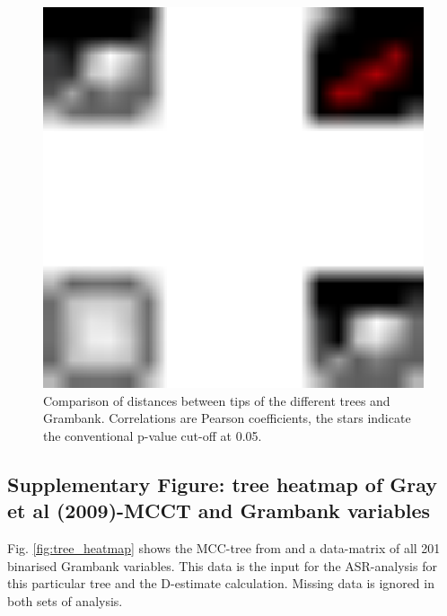 \documentclass[12pt,letterpaper]{article}
\begin{document}
\begin{figure}[!ht]
\centering
\includegraphics[width=17cm]{illustrations/plots_from_R/SPLOM_tree_dists.png}
\caption{Comparison of distances between tips of the different trees and Grambank. Correlations are Pearson coefficients, the stars indicate the conventional p-value cut-off at 0.05.}
\label{tree_dist_splom}
\end{figure}


\subsection{Supplementary Figure: tree heatmap of Gray et al (2009)-MCCT and Grambank variables}
\label{supp:fig_tree_heatmap}

Fig. \ref{fig:tree_heatmap} shows the MCC-tree from \citet{grayetal_2009} and a data-matrix of all 201 binarised Grambank variables. This data is the input for the ASR-analysis for this particular tree and the D-estimate calculation. Missing data is ignored in both sets of analysis.
\end{document}
